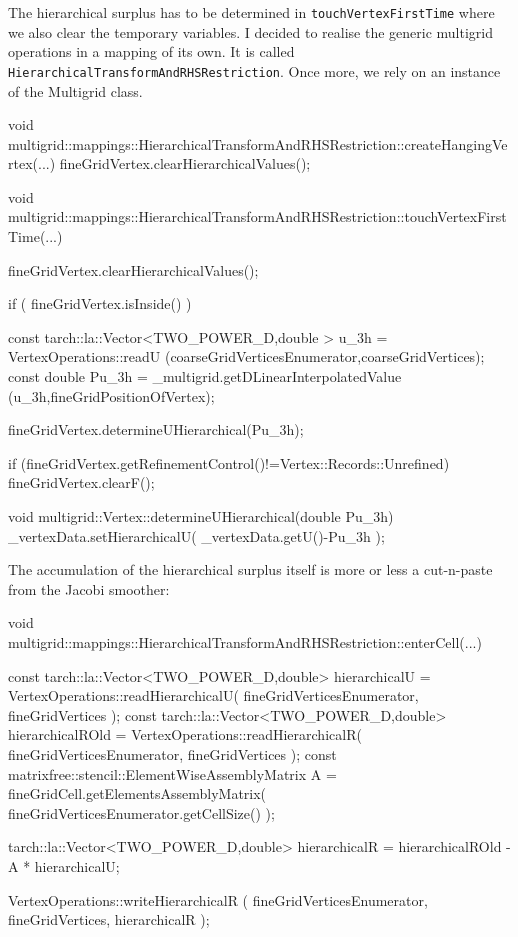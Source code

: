 \noindent
The hierarchical surplus has to be determined in \texttt{touchVertexFirstTime}
where we also clear the temporary variables.
I decided to realise the generic multigrid operations in a mapping of its own. 
It is called \texttt{HierarchicalTransformAndRHSRestriction}.
Once more, we rely on an instance of the Multigrid class.

\begin{code}
void
multigrid::mappings::HierarchicalTransformAndRHSRestriction::createHangingVertex(...) { 
  fineGridVertex.clearHierarchicalValues();
}

void multigrid::mappings::HierarchicalTransformAndRHSRestriction::touchVertexFirstTime(...) {
  fineGridVertex.clearHierarchicalValues();

  if ( fineGridVertex.isInside() ) {
    const tarch::la::Vector<TWO_POWER_D,double > u_3h  = VertexOperations::readU
      (coarseGridVerticesEnumerator,coarseGridVertices);
    const double                                 Pu_3h = _multigrid.getDLinearInterpolatedValue
      (u_3h,fineGridPositionOfVertex);

    fineGridVertex.determineUHierarchical(Pu_3h);

    if (fineGridVertex.getRefinementControl()!=Vertex::Records::Unrefined) {
      fineGridVertex.clearF();
    }
  }
}

void multigrid::Vertex::determineUHierarchical(double Pu_3h) {
  _vertexData.setHierarchicalU( _vertexData.getU()-Pu_3h );
}
\end{code}



\noindent
The accumulation of the hierarchical surplus itself is more or less a
cut-n-paste from the Jacobi smoother:
\begin{code}

void multigrid::mappings::HierarchicalTransformAndRHSRestriction::enterCell(...) { 
  const tarch::la::Vector<TWO_POWER_D,double> hierarchicalU    =
     VertexOperations::readHierarchicalU( fineGridVerticesEnumerator, fineGridVertices );
   const tarch::la::Vector<TWO_POWER_D,double> hierarchicalROld =
     VertexOperations::readHierarchicalR( fineGridVerticesEnumerator, fineGridVertices );
   const matrixfree::stencil::ElementWiseAssemblyMatrix A =
     fineGridCell.getElementsAssemblyMatrix( fineGridVerticesEnumerator.getCellSize() );

   tarch::la::Vector<TWO_POWER_D,double> hierarchicalR = 
     hierarchicalROld - A * hierarchicalU;

   VertexOperations::writeHierarchicalR
     ( fineGridVerticesEnumerator, fineGridVertices, hierarchicalR );
}
\end{code}

